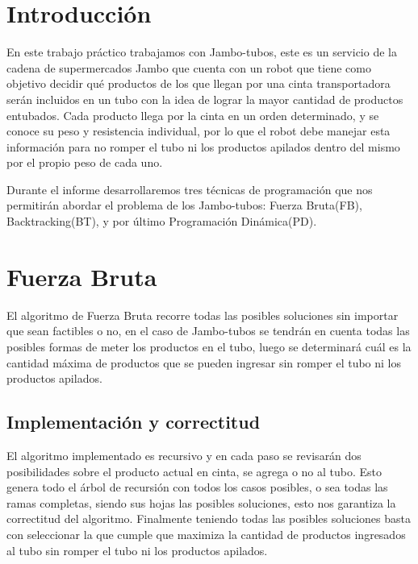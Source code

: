 \documentclass[10pt,a4paper]{article}
\begin{document}

\subtitulo{}

\fecha{\today}



\maketitle

\tableofcontents

\newpage

\setcounter{page}{1}

\section{Introducción} \label{sec:introduccion}
En este trabajo práctico trabajamos con Jambo-tubos, este es un servicio de la cadena de supermercados Jambo que cuenta con un robot que tiene como objetivo decidir qué productos de los que llegan por una cinta transportadora serán incluidos en un tubo con la idea de lograr la mayor cantidad de productos entubados. Cada producto llega por la cinta en un orden determinado, y se conoce su peso y resistencia individual, por lo que el robot debe manejar esta información para no romper el tubo ni los productos apilados dentro del mismo por el propio peso de cada uno. \cite{ref:enunciado}

Durante el informe desarrollaremos tres técnicas de programación que nos permitirán abordar el problema de los Jambo-tubos: Fuerza Bruta(FB), Backtracking(BT), y por último Programación Dinámica(PD).

\section{Fuerza Bruta} \label{sec:fuerza_bruta}
El algoritmo de Fuerza Bruta recorre todas las posibles soluciones sin importar que sean factibles o no, en el caso de Jambo-tubos se tendrán en cuenta todas las posibles formas de meter los productos en el tubo, luego se determinará cuál es la cantidad máxima de productos que se pueden ingresar sin romper el tubo ni los productos apilados.

\subsection{Implementación y correctitud}
El algoritmo implementado es recursivo y en cada paso se revisarán dos posibilidades sobre el producto actual en cinta, se agrega o no al tubo. Esto genera todo el árbol de recursión con todos los casos posibles, o sea todas las ramas completas, siendo sus hojas las posibles soluciones, esto nos garantiza la correctitud del algoritmo. Finalmente teniendo todas las posibles soluciones basta con seleccionar la que cumple que maximiza la cantidad de productos ingresados al tubo sin romper el tubo ni los productos apilados.
\end{document}

